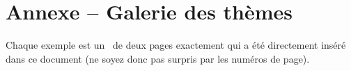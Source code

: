 \documentclass[a4paper, 12pt, theme = color]{../main/main}
\begin{document}
\bgroup
	\titleformat{\section}[block]{\Huge\bfseries\filcenter}{}{1em}{}
	\section*{Annexe -- Galerie des thèmes}%
	\label{tutodoc-theme-gallery}
\egroup

\bigskip

\begin{tdocnote}
	Chaque exemple est un \pdf\ de deux pages exactement qui a été directement inséré dans ce document (ne soyez donc pas surpris par les numéros de page).
\end{tdocnote}
\end{document}
